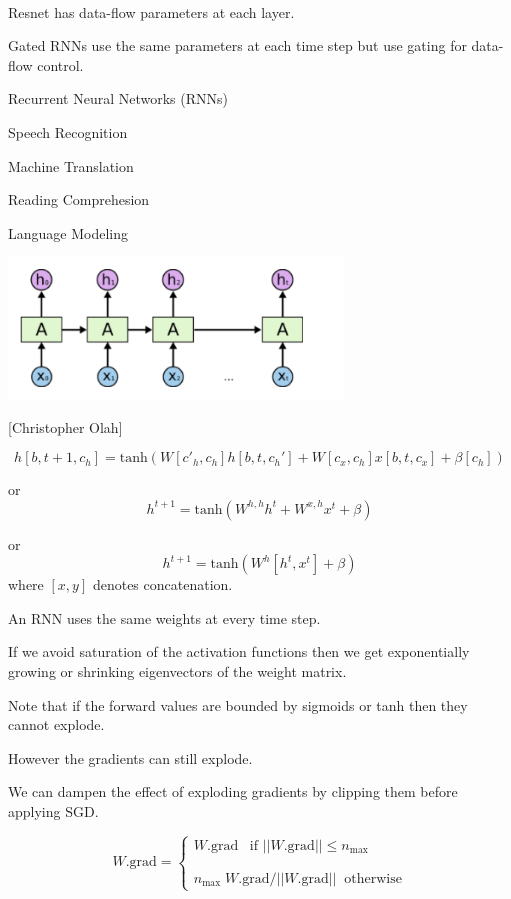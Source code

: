 {\begin{minipage}[b]{6in}
  ~
  \vspace{3ex}
  ~

\end{minipage}


Resnet has data-flow parameters at each layer.

\vfill
Gated RNNs use the same parameters at each time step but use gating for data-flow control.

\slide{}
\centerline{Recurrent Neural Networks (RNNs)}

\vfill
\centerline{Speech Recognition}
\vfill
\centerline{Machine Translation}
\vfill
\centerline{Reading Comprehesion}
\vfill
\centerline{Language Modeling}

\vfill


\centerline{\includegraphics[width=3.5in]{../images/RNN}}
\centerline{{\large [Christopher Olah]}}

$$h[b,t+1,c_h] = \mathrm{tanh}(W[c'_h,c_h]h[b,t,c_h'] + W[c_x,c_h]x[b,t,c_x] + \beta[c_h])$$

\vfill
or
$$h^{t+1} = \mathrm{tanh}(W^{h,h}h^t + W^{x,h}x^t + \beta)$$

\vfill
or
$$h^{t+1} = \mathrm{tanh}(W^h[h^t,x^t] + \beta)$$
where $[x,y]$ denotes concatenation.


An RNN uses the same weights at every time step.

\vfill
If we avoid saturation of the activation functions then we get exponentially growing or shrinking eigenvectors of the weight matrix.

\vfill
Note that if the forward values are bounded by sigmoids or tanh then they cannot explode.

\vfill
However the gradients can still explode.


\vfill
We can dampen the effect of exploding gradients by clipping them before applying SGD.

\vfill
$$W.\mathrm{grad} = \left\{\begin{array}{l} W.\mathrm{grad} \;\;\;\mbox{if $||W.\mathrm{grad}|| \leq n_{\mathrm{max}}$} \\
                                                      \\ \\
                                                      n_{\mathrm{max}} \; W.\mathrm{grad} / ||W.\mathrm{grad}|| \;\; \mbox{otherwise}
\end{array} \right.$$

}
